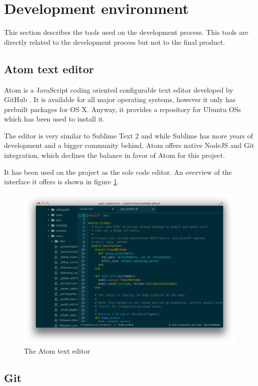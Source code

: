 \section{Development environment}

This section describes the tools used on the development process. This tools are directly related to the development process but not to the final product.

\subsection{Atom text editor}

Atom is a JavaScript coding oriented configurable text editor developed by GitHub \cite{atom}. It is available for all major operating systems, however it only has prebuilt packages for OS X. Anyway, it provides a repository for Ubuntu OSs which has been used to install it.

The editor is very similar to Sublime Text 2 \cite{sublime} and while Sublime has more years of development and a bigger community behind, Atom offers native NodeJS and Git integration, which declines the balance in favor of Atom for this project. 

It has been used on the project as the sole code editor. An overview of the interface it offers is shown in figure \ref{fig:atom}.

\begin{figure}[ht]
  \centering
  \includegraphics[width=.8\textwidth]{fig/atom}
  \caption{The Atom text editor}
  \label{fig:atom}
\end{figure} 

\subsection{Git}

